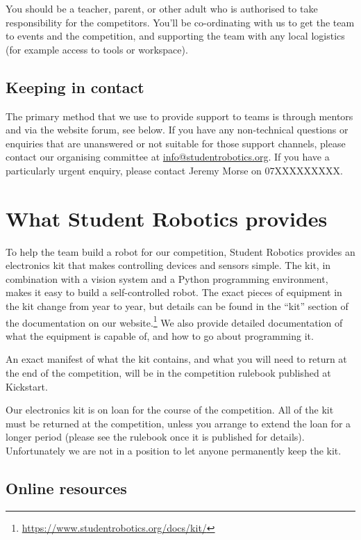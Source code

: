 \documentclass[a4paper]{article}
\begin{document}
You should be a teacher, parent, or other adult who is authorised to take
responsibility for the competitors. You'll be co-ordinating with us to get the
team to events and the competition, and supporting the team with any local
logistics (for example access to tools or workspace).

\subsection*{Keeping in contact}

The primary method that we use to provide support to teams is through mentors
and via the website forum, see below. If you have any non-technical questions
or enquiries that are unanswered or not suitable for those support channels,
please contact our organising committee at \url{info@studentrobotics.org}. If
you have a particularly urgent enquiry, please contact Jeremy Morse on
07XXXXXXXXX.

\section*{What Student Robotics provides}

To help the team build a robot for our competition, Student Robotics provides
an electronics kit that makes controlling devices and sensors simple. The kit,
in combination with a vision system and a Python programming environment,
makes it easy to build a self-controlled robot. The exact pieces of equipment
in the kit change from year to year, but details can be found in the ``kit''
section of the documentation on our
website.\footnote{\url{https://www.studentrobotics.org/docs/kit/}}
We also provide detailed documentation of what the equipment is capable of,
and how to go about programming it.

An exact manifest of what the kit contains, and what you will need to return
at the end of the competition, will be in the competition rulebook published
at Kickstart.

Our electronics kit is on loan for the course of the competition. All of the
kit must be returned at the competition, unless you arrange to extend the loan
for a longer period (please see the rulebook once it is published for details).
Unfortunately we are not in a position to let anyone permanently keep the kit.

\subsection*{Online resources}
\end{document}
